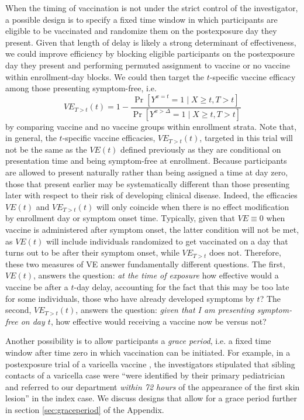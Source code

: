 \documentclass[11pt]{article}
\begin{document}
When the timing of vaccination is not under the strict control of the investigator, a possible design is to specify a fixed time window in which participants are eligible to be vaccinated and randomize them on the postexposure day they present. Given that length of delay is likely a strong determinant of effectiveness, we could improve efficiency by blocking eligible participants on the postexposure day they present and performing permuted assignment to vaccine or no vaccine within enrollment-day blocks. We could then target the $t$-specific vaccine efficacy among those presenting symptom-free, i.e.
$$
VE_{T > t}(t) = 1 - \frac{\Pr[Y^{x = t} = 1 \mid X \geq t, T > t]}{\Pr[Y^{x > \Delta} = 1 \mid X \geq t, T > t]} 
$$
by comparing vaccine and no vaccine groups within enrollment  strata. Note that, in general, the $t$-specific vaccine efficacies, $VE_{T > t}(t)$, targeted in this trial will not be the same as the $VE(t)$ defined previously as they are conditional on presentation time and being symptom-free at enrollment. Because participants are allowed to present naturally rather than being assigned a time at day zero, those that present earlier may be systematically different than those presenting later with respect to their risk of developing clinical disease. Indeed, the efficacies $VE(t)$ and $VE_{T > t}(t)$ will only coincide when there is no effect modification by enrollment day or symptom onset time. Typically, given that $VE \equiv 0$ when vaccine is administered after symptom onset, the latter condition will not be met, as $VE(t)$ will include individuals randomized to get vaccinated on a day that turns out to be after their symptom onset, while $VE_{T > t}$ does not.  Therefore, these two measures of VE answer fundamentally different questions. The first, $VE(t)$, answers the question: \textit{at the time of exposure} how effective would a vaccine be after a $t$-day delay, accounting for the fact that this may be too late for some individuals, those who have already developed symptoms by $t$? The second, $VE_{T > t}(t)$, answers the question: \textit{given that I am presenting symptom-free on day $t$}, how effective would receiving a vaccine now be versus not? 

Another possibility is to allow participants a \textit{grace period}\cite{smith_emulation_2022}, i.e. a fixed time window after time zero in which vaccination can be initiated. For example, in a postexposure trial of a varicella vaccine \cite{mor_efficacy_2004}, the investigators stipulated that sibling contacts of a varicella case were ``were identified by their primary pediatrician and referred to our department \textit{within 72 hours} of the appearance of the first skin lesion'' in the index case. We discuss designs that allow for a grace period further in section \ref{sec:graceperiod} of the Appendix.
\end{document}
